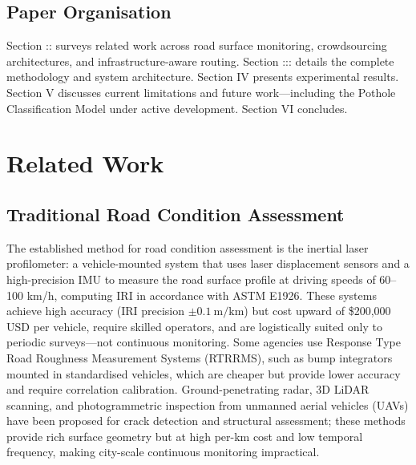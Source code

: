 \documentclass[conference]{IEEEtran}
\begin{document}
\subsection{Paper Organisation}
Section :: surveys related work across road surface monitoring, crowdsourcing architectures, and infrastructure-aware routing.
Section ::: details the complete methodology and system architecture. Section IV presents experimental results.
Section V discusses current limitations and future work---including the Pothole Classification Model under active development. Section VI concludes.

\section{Related Work}

\subsection{Traditional Road Condition Assessment}
The established method for road condition assessment is the inertial laser profilometer: a vehicle-mounted system that uses laser displacement sensors and a high-precision IMU to measure the road surface profile at driving speeds of 60--100 km/h, computing IRI in accordance with ASTM E1926.
These systems achieve high accuracy (IRI precision $\pm0.1~\text{m/km}$) but cost upward of \$200,000 USD per vehicle, require skilled operators, and are logistically suited only to periodic surveys---not continuous monitoring.
Some agencies use Response Type Road Roughness Measurement Systems (RTRRMS), such as bump integrators mounted in standardised vehicles, which are cheaper but provide lower accuracy and require correlation calibration.
Ground-penetrating radar, 3D LiDAR scanning, and photogrammetric inspection from unmanned aerial vehicles (UAVs) have been proposed for crack detection and structural assessment;
these methods provide rich surface geometry but at high per-km cost and low temporal frequency, making city-scale continuous monitoring impractical.
\end{document}
